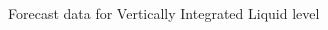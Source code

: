                  \begin{figure}[!t]
                   \begin{center}
                     \begin{subfigmatrix}{2}
                     \end{subfigmatrix}
                     \caption{Forecast data for Vertically Integrated Liquid level}
                     \label{fig:vil}
                   \end{center}
                 \end{figure}

